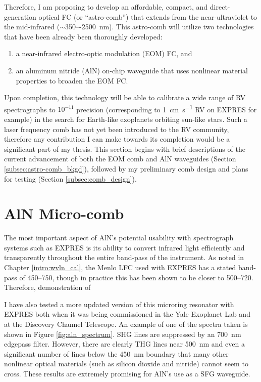 Therefore, I am proposing to develop an affordable, compact, and direct-generation optical FC (or ``astro-comb'') that extends from the near-ultraviolet to the mid-infrared ($\sim$350–-\SI{2500}{\nano\meter}). This astro-comb will utilize two technologies that have been already been thoroughly developed:
\begin{enumerate}
    \item a near-infrared electro-optic modulation (EOM) FC, and
    \item an aluminum nitride (AlN) on-chip waveguide that uses nonlinear material properties to broaden the EOM FC.
\end{enumerate}
Upon completion, this technology will be able to calibrate a wide range of RV spectrographs to $10^{-11}$ precision (corresponding to \SI{1}{\centi\meter\per\second} RV on EXPRES for example) in the search for Earth-like exoplanets orbiting sun-like stars. Such a laser frequency comb has not yet been introduced to the RV community, therefore any contribution I can make towards its completion would be a significant part of my thesis. This section begins with brief descriptions of the current advancement of both the EOM comb and AlN waveguides (Section \ref{subsec:astro-comb_bkgd}), followed by my preliminary comb design and plans for testing (Section \ref{subsec:comb_design}).

\section{AlN Micro-comb}

The most important aspect of AlN's potential usability with spectrograph systems such as EXPRES is its ability to convert infrared light efficiently and transparently throughout the entire band-pass of the instrument. As noted in Chapter \ref{intro:wvln_cal}, the Menlo LFC used with EXPRES has a stated band-pass of 450--750\nm, though in practice this has been shown to be closer to 500--720\nm. Therefore, demonstration of 

I have also tested a more updated version of this microring resonator with EXPRES both when it was being commissioned in the Yale Exoplanet Lab and at the Discovery Channel Telescope. An example of one of the spectra taken is shown in Figure \ref{fig:aln_spectrum}. SHG lines are suppressed by an \SI{700}{\nano\meter} edgepass filter. However, there are clearly THG lines near \SI{500}{\nano\meter} and even a significant number of lines below the \SI{450}{\nano\meter} boundary that many other nonlinear optical materials (such as silicon dioxide and nitride) cannot seem to cross. These results are extremely promising for AlN's use as a SFG waveguide.

